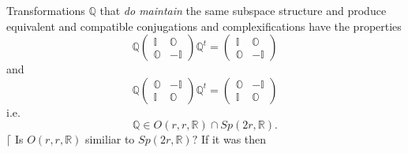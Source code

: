 \documentclass[aps,preprint]{revtex4}
\begin{document}
Transformations $\mathbb{Q}$ that \emph{do maintain} the same subspace
structure and produce equivalent and compatible conjugations and
complexifications have the properties 
\begin{equation}
\mathbb{Q}\left( 
\begin{array}{cc}
\mathbb{I} & \mathbb{O} \\ 
\mathbb{O} & -\mathbb{I}%
\end{array}%
\right) \mathbb{Q}^{t}=\left( 
\begin{array}{cc}
\mathbb{I} & \mathbb{O} \\ 
\mathbb{O} & -\mathbb{I}%
\end{array}%
\right)
\end{equation}%
and 
\begin{equation}
\mathbb{Q}\left( 
\begin{array}{cc}
\mathbb{O} & -\mathbb{I} \\ 
\mathbb{I} & \mathbb{O}%
\end{array}%
\right) \mathbb{Q}^{t}=\left( 
\begin{array}{cc}
\mathbb{O} & -\mathbb{I} \\ 
\mathbb{I} & \mathbb{O}%
\end{array}%
\right)
\end{equation}%
i.e. 
\begin{equation}
\mathbb{Q}\in O\left( r,r,\mathbb{R}\right) \cap Sp\left( 2r,\mathbb{R}%
\right) .
\end{equation}%
$\lceil $ Is $O\left( r,r,\mathbb{R}\right) $ similiar to $Sp\left( 2r,%
\mathbb{R}\right) ?$ If it was then 
\end{document}
